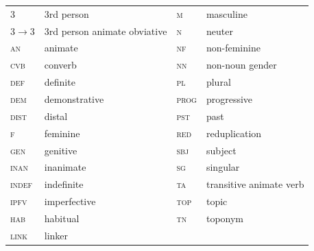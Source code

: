 \documentclass[output=collectionpaper]{langsci/langscibook}
\begin{document}
\begin{tabularx}{\textwidth}{lXlX}
  3	&	3rd person	&	\textsc{m}	&	masculine	\\
  3$ \rightarrow $3	&	3rd person animate obviative	&	\textsc{n}	&	neuter	\\
  \textsc{an}	&	animate	&	\textsc{nf}	&	non-feminine	\\
  \textsc{cvb}	&	converb	&	\textsc{nn}	&	non-noun gender	\\
  \textsc{def}	&	definite	&	\textsc{pl}	&	plural	\\
  \textsc{dem}	&	demonstrative	&	\textsc{prog}	&	progressive	\\
  \textsc{dist}	&	distal	&	\textsc{pst}	&	past	\\
  \textsc{f}	&	feminine	&	\textsc{red}	&	reduplication	\\
  \textsc{gen}	&	genitive	&	\textsc{sbj}	&	subject	\\
  \textsc{inan}	&	inanimate	&	\textsc{sg}	&	singular	\\
  \textsc{indef}	&	indefinite	&	\textsc{ta}	&	transitive animate verb	\\
  \textsc{ipfv}	&	imperfective	&	\textsc{top}	&	topic	\\
  \textsc{hab}	&	habitual	&	\textsc{tn}	&	toponym	\\
  \textsc{link}	&	linker	&		&		\\
\end{tabularx}


\printbibliography[heading=subbibliography,notkeyword=this]

\newpage
\end{document}
